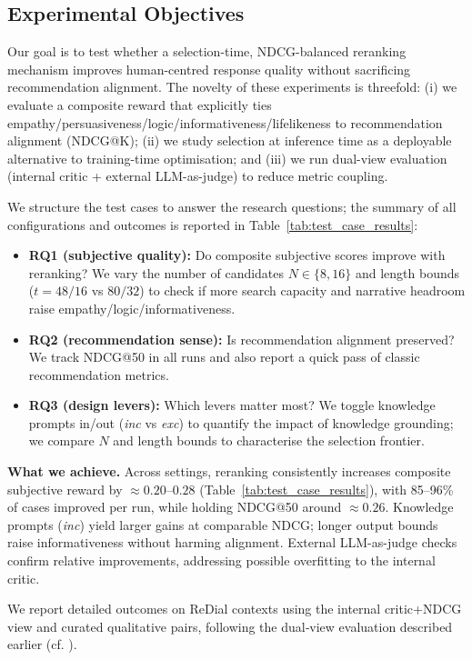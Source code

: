 \documentclass[12pt]{article}
\begin{document}
  \subsection{Experimental Objectives}
  Our goal is to test whether a selection-time, NDCG-balanced reranking mechanism improves human-centred response quality without sacrificing recommendation alignment. The novelty of these experiments is threefold: (i) we evaluate a composite reward that explicitly ties empathy/persuasiveness/logic/informativeness/lifelikeness to recommendation alignment (NDCG@K); (ii) we study selection at inference time as a deployable alternative to training-time optimisation; and (iii) we run dual-view evaluation (internal critic + external LLM-as-judge) to reduce metric coupling.
  
  We structure the test cases to answer the research questions; the summary of all configurations and outcomes is reported in Table~\ref{tab:test_case_results}:
  \begin{itemize}[leftmargin=*]
    \item \textbf{RQ1 (subjective quality):} Do composite subjective scores improve with reranking? We vary the number of candidates $N\in\{8,16\}$ and length bounds ($t=48/16$ vs $80/32$) to check if more search capacity and narrative headroom raise empathy/logic/informativeness.
    \item \textbf{RQ2 (recommendation sense):} Is recommendation alignment preserved? We track NDCG@50 in all runs and also report a quick pass of classic recommendation metrics.
    \item \textbf{RQ3 (design levers):} Which levers matter most? We toggle knowledge prompts in/out (\textit{inc} vs \textit{exc}) to quantify the impact of knowledge grounding; we compare $N$ and length bounds to characterise the selection frontier.
  \end{itemize}
  
  \textbf{What we achieve.} Across settings, reranking consistently increases composite subjective reward by \(\approx 0.20\)–\(0.28\) (Table~\ref{tab:test_case_results}), with 85–96\% of cases improved per run, while holding NDCG@50 around \(\approx 0.26\). Knowledge prompts (\textit{inc}) yield larger gains at comparable NDCG; longer output bounds raise informativeness without harming alignment. External LLM-as-judge checks confirm relative improvements, addressing possible overfitting to the internal critic.
  
  We report detailed outcomes on ReDial contexts \citep{charlin2018redial} using the internal critic+NDCG view and curated qualitative pairs, following the dual‑view evaluation described earlier (cf. \citealp{zhang2024ecr,yan2023llmjudge}).
  
\end{document}
